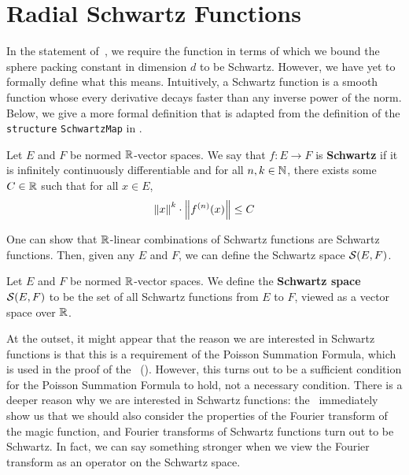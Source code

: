 \section{Radial Schwartz Functions}

In the statement of~, we require the function in terms of which we bound the sphere packing constant in dimension $d$ to be Schwartz. However, we have yet to formally define what this means. Intuitively, a Schwartz function is a smooth function whose every derivative decays faster than any inverse power of the norm. Below, we give a more formal definition that is adapted from the definition of the \verb|structure| \verb|SchwartzMap| in \mathlib.

\begin{boxdefinition}
    Let $E$ and $F$ be normed $\mathbb{R}$-vector spaces. We say that $f : E \to F$ is \textbf{Schwartz} if it is infinitely continuously differentiable and for all $n, k \in \mathbb{N}$, there exists some $C \in \mathbb{R}$ such that for all $x \in E$,
    \begin{align*}
        \left\lVert x \right\rVert^k \cdot \left\lVert f^{(n)}(x) \right\rVert \leq C
    \end{align*}
\end{boxdefinition}

One can show that $\mathbb{R}$-linear combinations of Schwartz functions are Schwartz functions. Then, given any $E$ and $F$, we can define the Schwartz space $\mathcal{S}(E, F)$.

\begin{boxdefinition}
    Let $E$ and $F$ be normed $\mathbb{R}$-vector spaces. We define the \textbf{Schwartz space} $\mathcal{S}(E, F)$ to be the set of all Schwartz functions from $E$ to $F$, viewed as a vector space over $\mathbb{R}$.
\end{boxdefinition}

At the outset, it might appear that the reason we are interested in Schwartz functions is that this is a requirement of the Poisson Summation Formula, which is used in the proof of the \CELP\ (). However, this turns out to be a sufficient condition for the Poisson Summation Formula to hold, not a necessary condition. There is a deeper reason why we are interested in Schwartz functions: the \CEC\ immediately show us that we should also consider the properties of the Fourier transform of the magic function, and Fourier transforms of Schwartz functions turn out to be Schwartz. In fact, we can say something stronger when we view the Fourier transform as an operator on the Schwartz space.

